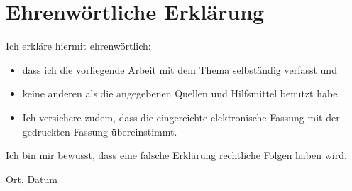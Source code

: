 \clearpage
\chapter*{Ehrenwörtliche Erklärung}	



Ich erkläre hiermit ehrenwörtlich: 

\begin{itemize}
	\item dass ich die vorliegende Arbeit mit dem Thema \textit{\DerTitelDerArbeit} selbständig verfasst und
	\item keine anderen als die angegebenen Quellen und Hilfsmittel benutzt habe. 
	\item Ich versichere zudem, dass die eingereichte elektronische Fassung mit der gedruckten Fassung übereinstimmt.
\end{itemize}
Ich bin mir bewusst, dass eine falsche Erklärung rechtliche Folgen haben wird.

\vspace{3cm}
Ort, Datum \hfill \DerAutorDerArbeit 